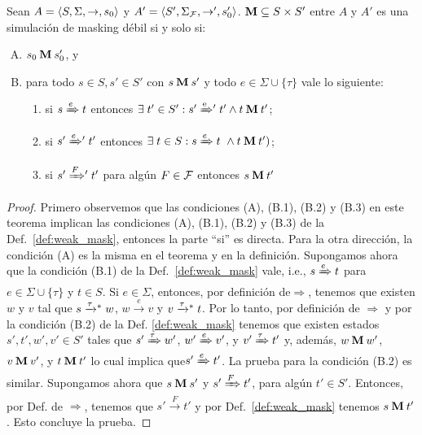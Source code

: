 \begin{theorem} \label{thm:weak_thm}
  Sean
$A =\langle S, \Sigma, \rightarrow, s_0 \rangle$ y $A' =\langle S', \Sigma_{\mathcal{F}}, \rightarrow', s'_0 \rangle$. 
$\mathbin{\mathbf{M}} \subseteq S \times S'$ entre $A$ y $A'$ es una simulación de masking débil si y solo si:

\begin{enumerate}[(A)]
  \item $s_0 \mathbin{\mathbf{M}} s'_0$, y
  \item para todo $s \in S, s' \in S'$ con $s \mathbin{\mathbf{M}} s'$ y todo $e \in \Sigma \cup \{\tau\}$ vale lo siguiente:

  \begin{enumerate}[(1)]
    \item si $s \xRightarrow{e} t$ entonces $\exists\; t' \in S': s' \mathrel{{\xRightarrow[]{\text{e}}}{}'} t' 
    \wedge t \mathbin{\mathbf{M}} t'$;

      \item si $s' \mathrel{{\xRightarrow[]{e}}{}'} t'$ entonces 
      $\exists \; t \in S: s \xRightarrow{e} t \
      \wedge t \mathbin{\mathbf{M}} t')$;

      \item si $s' \mathrel{{\xRightarrow[]{F}}{}'} t'$ para algún $F \in \mathcal{F}$ entonces 
      $s \mathbin{\mathbf{M}} t'$
  \end{enumerate}
\end{enumerate}

\end{theorem}

\noindent
\begin{proof}
	Primero observemos que las condiciones (A), (B.1), (B.2) y (B.3) en este teorema implican las condiciones (A), (B.1), (B.2) y (B.3)
 de la Def.~\ref{def:weak_mask}, entonces la parte ``si'' es directa. Para la otra dirección, la condición (A) es la misma en el teorema y en la definición.
 Supongamos ahora que la condición (B.1) de la Def.~\ref{def:weak_mask} vale, i.e.,
 $s \xRightarrow{e} t$ para $e \in \Sigma \cup \{\tau\}$ y $t \in S$. 
Si $e \in \Sigma$, entonces, por definición de$\Rightarrow$, tenemos que existen $w$ y $v$ tal que $s \mathrel{{\xrightarrow[]{\tau}}{}^*} w$, $w \xrightarrow{e} v$
 y $v \mathrel{{\xrightarrow[]{\tau}}{}^*} t$. Por lo tanto, por definición de $\Rightarrow$ y por la condición (B.2) de la Def. \ref{def:weak_mask} 
 tenemos que existen estados $s',t',w',v' \in S'$
 tales que $s' \xRightarrow{\tau} w'$, $w' \xRightarrow{e} v'$, y $v' \xRightarrow{\tau} t'$ y, 
 además, $w \mathbin{\mathbf{M}} w'$, $v \mathbin{\mathbf{M}} v'$, y $t \mathbin{\mathbf{M}} t'$ lo cual implica que$s' \xRightarrow{e} t'$. 
 La prueba para la condición (B.2) es similar.
 	Supongamos ahora que $s \mathbin{\mathbf{M}} s'$ y $s' \xRightarrow{F} t'$, para algún $t' \in S'$. Entonces, por Def. de 
$\Rightarrow$, tenemos que $s' \xrightarrow{F} t'$ y por Def.~\ref{def:weak_mask}
 tenemos $s \mathbin{\mathbf{M}} t'$ . Esto concluye la prueba.
 \qedhere 
 \end{proof} 
 

